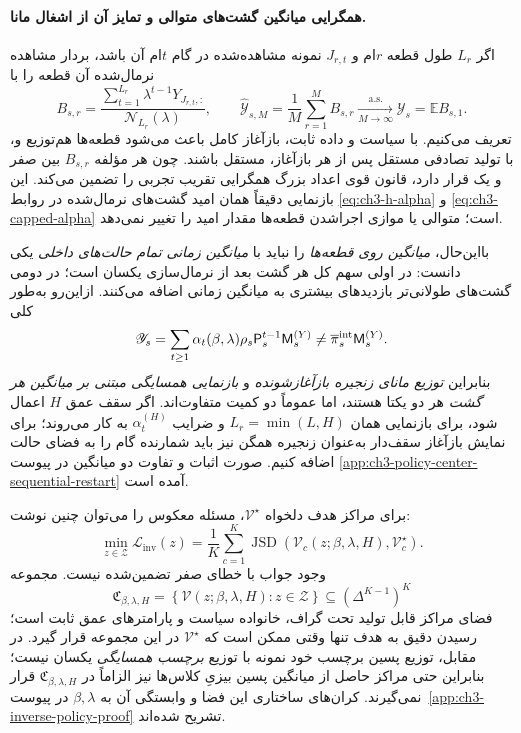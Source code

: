\paragraph{همگرایی میانگین گشت‌های متوالی و تمایز آن از اشغال مانا.}
اگر $L_r$ طول قطعه $r$ام و
$J_{r,t}$ نمونه مشاهده‌شده
در گام $t$ام آن باشد،
بردار مشاهده نرمال‌شده
آن قطعه را با
\begin{equation}\label{eq:ch3-sequential-episode-average}
\boxed{
B_{s,r}=
\frac{\sum_{t=1}^{L_r}
\lambda^{t-1}Y_{J_{r,t},:}}
{\mathcal N_{L_r}(\lambda)},
\qquad
\widehat{\mathscr Y}_{s,M}
=\frac1M\sum_{r=1}^{M}B_{s,r}
\xrightarrow[M\to\infty]{\mathrm{a.s.}}
\mathscr Y_s=\mathbb E B_{s,1}.
}
\end{equation}
تعریف می‌کنیم.
با سیاست و داده ثابت،
بازآغاز کامل باعث می‌شود
قطعه‌ها هم‌توزیع و،
با تولید تصادفی مستقل
پس از هر بازآغاز،
مستقل باشند.
چون هر مؤلفه $B_{s,r}$
بین صفر و یک قرار دارد،
قانون قوی اعداد بزرگ
همگرایی تقریب تجربی
را تضمین می‌کند.
این بازنمایی دقیقاً همان
امید گشت‌های نرمال‌شده
در روابط
\eqref{eq:ch3-h-alpha}
و \eqref{eq:ch3-capped-alpha}
است؛ متوالی یا موازی
اجراشدن قطعه‌ها
مقدار امید را تغییر
نمی‌دهد.

بااین‌حال، \emph{میانگین
روی قطعه‌ها} را
نباید با \emph{میانگین
زمانی تمام حالت‌های
داخلی} یکی دانست:
در اولی سهم کل هر
گشت بعد از نرمال‌سازی
یکسان است؛ در دومی
گشت‌های طولانی‌تر
بازدیدهای بیشتری
به میانگین زمانی
اضافه می‌کنند.
ازاین‌رو به‌طور کلی
\[
\mathscr Y_s
=\sum_{t\ge1}\alpha_t(\beta,\lambda)
\rho_s\mathsf P_s^{t-1}\mathsf M_s^{(Y)}
\ne
\overline\pi_s^{\rm int}\mathsf M_s^{(Y)}.
\]
بنابراین \emph{توزیع
مانای زنجیره بازآغازشونده}
و \emph{بازنمایی همسایگی
مبتنی بر میانگین هر گشت}
هر دو یکتا هستند،
اما عموماً دو کمیت
متفاوت‌اند. اگر
سقف عمق $H$ اعمال شود،
برای بازنمایی همان
$L_r=\min(L,H)$ و
ضرایب $\alpha_t^{(H)}$
به کار می‌روند؛
برای نمایش بازآغاز
سقف‌دار به‌عنوان
زنجیره همگن نیز
باید شمارنده گام
را به فضای حالت
اضافه کنیم.
صورت اثبات و
تفاوت دو میانگین
در پیوست
\ref{app:ch3-policy-center-sequential-restart}
آمده است.


برای مراکز هدف دلخواه $\mathcal V^\star$، مسئله معکوس را می‌توان چنین نوشت:
\begin{equation}\label{eq:ch3-center-inverse-loss}
\boxed{\min_{z\in\mathcal Z}
\mathcal L_{\mathrm{inv}}(z)=
\frac1K\sum_{c=1}^{K}
\operatorname{JSD}\!\left(
\mathcal V_c(z;\beta,\lambda,H),\mathcal V_c^\star
\right).}
\end{equation}
وجود جواب با خطای صفر تضمین‌شده نیست. مجموعه
\begin{equation}\label{eq:ch3-attainable-centers}
\mathfrak C_{\beta,\lambda,H}
=\left\{\mathcal V(z;\beta,\lambda,H):z\in\mathcal Z\right\}
\subseteq(\Delta^{K-1})^K
\end{equation}
فضای مراکز قابل تولید تحت گراف، خانواده سیاست و پارامترهای عمق ثابت است؛ رسیدن دقیق به هدف تنها وقتی ممکن است که $\mathcal V^\star$ در این مجموعه قرار گیرد. در مقابل، توزیع پسین برچسب خود نمونه با توزیع \emph{برچسب همسایگی} یکسان نیست؛ بنابراین حتی مراکز حاصل از میانگین پسین بیزیِ کلاس‌ها نیز الزاماً در $\mathfrak C_{\beta,\lambda,H}$ قرار نمی‌گیرند. کران‌های ساختاری این فضا و وابستگی آن به $\beta,\lambda$ در پیوست~\ref{app:ch3-inverse-policy-proof} تشریح شده‌اند.


